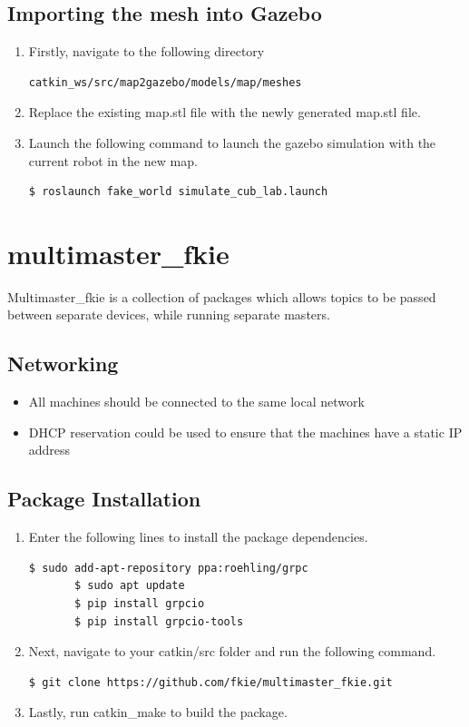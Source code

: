 \documentclass[11pt]{article}
\begin{document}
\subsection{Importing the mesh into Gazebo}
\begin{enumerate}
 \item {
       Firstly, navigate to the following directory
       \begin{lstlisting}[language=bash]
 catkin_ws/src/map2gazebo/models/map/meshes
        \end{lstlisting}
       }
 \item {
       Replace the existing map.stl file with the newly generated map.stl file.
       }
 \item{
       Launch the following command to launch the gazebo simulation with the current robot in the new map.
       \begin{lstlisting}[language=bash]
       $ roslaunch fake_world simulate_cub_lab.launch
        \end{lstlisting}

       }
\end{enumerate}

\section{multimaster\_fkie}
Multimaster\_fkie is a collection of packages which allows topics to be passed between separate devices, while running separate masters.


\subsection{Networking}
\begin{itemize}
 \item { All machines should be connected to the same local network}
 \item{ DHCP reservation could be used to ensure that the machines have a static IP address}
\end{itemize}
\subsection{Package Installation }
\begin{enumerate}
 \item {
       Enter the following lines to install the package dependencies.
       \begin{lstlisting}[language=bash]
       $ sudo add-apt-repository ppa:roehling/grpc
       $ sudo apt update
       $ pip install grpcio
       $ pip install grpcio-tools
        \end{lstlisting}
       }
 \item{
       Next, navigate to your catkin/src folder and run the following command.
       \begin{lstlisting}[language=bash]
         $ git clone https://github.com/fkie/multimaster_fkie.git
        \end{lstlisting}
       }
 \item{
       Lastly, run catkin\_make to build the package.
       }
\end{enumerate}
\end{document}
